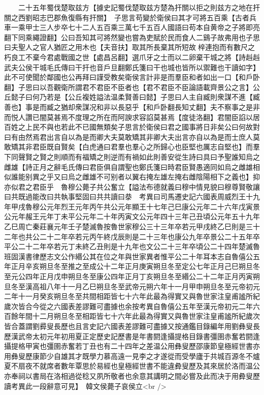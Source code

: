 　　二十五年蜀伐楚取兹方【據史記蜀伐楚取兹方楚為扞關以拒之則兹方之地在扞關之西劉昭志巴郡魚復縣有扞關】　子思言苟變於衛侯曰其才可將五百乘【古者兵車一乘甲士三人步卒七十二人五百乘三萬七千五百人國語曰苟本自黄帝之子將即亮翻下同乘繩證翻】公曰吾知其可將然變也嘗為吏賦於民而食人二鷄子故弗用也子思曰夫聖人之官人猶匠之用木也【夫音扶】取其所長棄其所短故梓連抱而有數尺之朽良工不棄今君處戰國之世【處昌呂翻】選爪牙之士而以二卵棄干城之將【詩赳赳武夫公侯干城毛氏傳曰干扞也音戶旦翻鄭氏箋曰干也城也皆所以禦難也干讀如字】此不可使聞於鄰國也公再拜曰謹受教矣衛侯言計非是而羣臣和者如出一口【和戶卧翻】子思曰以吾觀衛所謂君不君臣不臣者也【君不君臣不臣論語載齊景公之言】公丘懿子曰何乃若是【公丘複姓謚法温柔賢善曰懿】子思曰人主自臧則衆謀不進【臧善也】事是而臧之猶却衆謀况和非以長惡乎【和戶卧翻長知丈翻】夫不察事之是非而悦人讚已闇莫甚焉不度理之所在而阿諛求容諂莫甚焉【度徒洛翻】君闇臣諂以居百姓之上民不與也若此不已國無類矣子思言於衛侯曰君之國事將日非矣公曰何故對曰有由然焉君出言自以為是而卿大夫莫敢矯其非卿大夫出言亦自以為是而士庶人莫敢矯其非君臣既自賢矣【白虎通曰君羣也羣心之所歸心也臣堅也厲志自堅也】而羣下同聲賢之賢之則順而有福矯之則逆而有禍如此則善安從生詩曰具曰予聖誰知烏之雌雄【詩正月之辭毛氏傳曰君臣俱自謂聖也鄭氏箋曰時君臣賢愚適同如烏之雌雄相似誰能别異之乎又曰烏之雌雄不可别者以翼右掩左雄左掩右雌陰陽相下之義也】抑亦似君之君臣乎　魯穆公薨子共公奮立【謚法布德就義曰穆中情見貌曰穆尊賢敬讓曰共既過能改曰共執事堅固曰共共讀曰㳟　考異曰司馬遷史記六國表周威烈王十九年甲戌魯穆公元年烈王元年丙午共公元年顯王十七年己巳康公元年二十六年戊寅景公元年赧王元年丁未平公元年二十年丙寅文公元年四十三年己丑頃公元年五十九年乙巳周亡秦莊襄元年壬子楚滅魯按魯世家穆公三十三年卒若元甲戌終乙巳則是三十二年也共公二十二年卒若元丙午終戊辰則是二十三年也康公九年卒景公二十五年卒平公二十二年卒若元丁未終乙丑則是十九年也文公二十三年卒頃公二十四年楚滅魯班固漢書律歷志文公作緡公其在位之年與世家異者惟平公二十年耳本志自魯僖公五年正月辛亥朔旦冬至推之至成公十二年正月庚寅朔旦冬至定公七年正月己巳朔旦冬至元公四年正月戊申朔旦冬至康公四年正月丁亥朔旦冬至緡公二十二年正月丙寅朔旦冬至漢高祖八年十一月乙巳朔旦冬至武帝元朔六年十一月甲申朔旦冬至元帝初元二年十一月癸亥朔旦冬至共間相距皆七十六年此最為得實又與魯世家注皇甫謐所紀歲次皆合今從之六國表差謬難可盡據也余按考異自魯僖公五年至漢元帝初元二年六百餘年間十二月朔旦冬至相距皆七十六年此最為得實又與魯世家注皇甫謐所紀歲次皆合蓋謂劉彛叟長歷也且言史記六國表差謬難可盡據又按通鑑目錄編年用劉彝叟長歷漢武帝太初元年初用夏正定歷史記歷書是年書閼逢攝提格目錄書彊圉赤奮若閼逢攝提格甲寅也彊圉赤奮若丁丑也有二十四年之差温公用彝叟歷邵康節皇極經世書亦用彝叟歷康節少自雄其才既學力慕高遠一見李之才遂從而受學廬于共城百源冬不爐夏不扇夜不就席者數年覃思於易經也皇極經世書不能違彜叟歷及其來居於洛而温公亦奉祠以書局在洛相過從稔又夙所敬者也余意其講明之間必嘗及此而决于用彜叟歷讀考異此一段辭意可見】　韓文侯薨子哀侯立<br />
